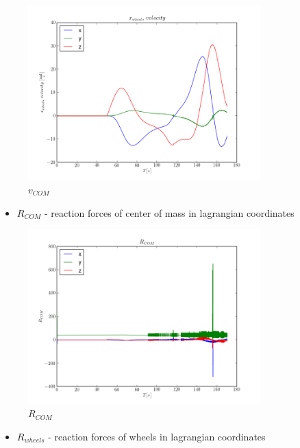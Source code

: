 \begin{figure}[H]
  \centering
    \includegraphics[width=0.8\textwidth]{vCOM8}
  \caption{$v_{COM}$}
\end{figure}

\begin{itemize}
  \item $R_{COM}$ - reaction forces of center of mass in lagrangian coordinates
\end{itemize}

\begin{figure}[H]
  \centering
    \includegraphics[width=0.8\textwidth]{pCOM8}
  \caption{$R_{COM}$}
\end{figure}

\begin{itemize}
  \item $R_{wheels}$ - reaction forces of wheels in lagrangian coordinates
\end{itemize}

